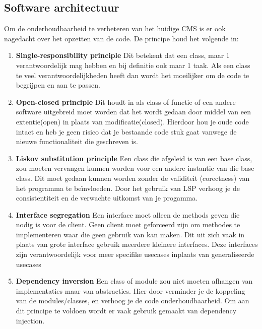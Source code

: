 \subsection{Software architectuur}
Om de onderhoudbaarheid te verbeteren van het huidige CMS is er ook nagedacht over het opzetten van de code.
De principe houd het volgende in: 
\begin{enumerate}
    \item \textbf{Single-responsibility principle}
    Dit betekent dat een class, maar 1 verantwoordelijk mag hebben en bij definitie ook maar 1 taak.
    Als een class te veel verantwoordelijkheden heeft dan wordt het moeilijker om de code te begrijpen en aan te passen.

    \item \textbf{Open-closed principle}
    Dit houdt in als class of functie of een andere software uitgebreid moet worden dat het wordt gedaan door middel van een extentie(open) in plaats van modificatie(closed).
    Hierdoor hou je oude code intact en heb je geen risico dat je bestaande code stuk gaat vanwege de nieuwe functionaliteit die geschreven is. 
        
    \item \textbf{Liskov substitution principle} 
    Een class die afgeleid is van een base class, zou moeten vervangen kunnen worden voor  een andere instantie van die base class.
    Dit moet gedaan kunnen worden zonder de validiteit (corectness) van het programma te beïnvloeden.
    Door het gebruik van LSP verhoog je de consistentiteit en de verwachte uitkomst van je progamma.

    \item \textbf{Interface segregation} 
    Een interface moet alleen de methods geven die nodig is voor de client. 
    Geen client moet geforceerd zijn om methodes te implementeren waar die geen gebruik van kan maken.
    Dit uit zich vaak in plaats van grote interface gebruik meerdere kleinere interfaces.
    Deze interfaces zijn verantwoordelijk voor meer specifike usecases inplaats van generaliseerde usecases

    \item \textbf{Dependency inversion} 
    Een class of module zou niet moeten afhangen van implementaties maar van abstracties.
    Hier door verminder je de koppeling van de modules/classes, en verhoog je de code onderhoudbaarheid.
    Om aan dit principe te voldoen wordt er vaak gebruik gemaakt van dependency injection.

\end{enumerate}

